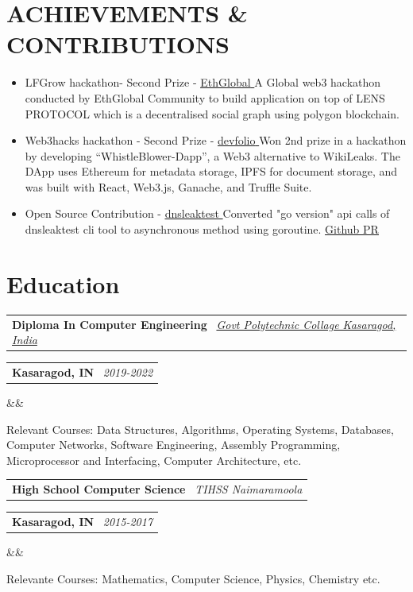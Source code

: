 \documentclass[11pt,a4paper,sans]{moderncv}
\makeatletter
\newcommand*{\customcventry}[7][0.13em]{
  \begin{tabular}{@{}l}
    {\bfseries #4} \
    {\itshape #3}
  \end{tabular}
  \hfill
  \begin{tabular}{l@{}}
    {\bfseries #5} \
    {\itshape #2}
  \end{tabular}
  \ifx&#7&
  \else{\
    \begin{minipage}{\maincolumnwidth}
      \small#7
  \end{minipage}}\fi
  \par\addvspace{#1}
}
\makeatother
\begin{document}
\section{ACHIEVEMENTS \& CONTRIBUTIONS}
{
  \begin{itemize}[label=\textbullet]
    \item LFGrow hackathon- Second Prize -
      \underline{
        \color{blue}\href{https://ethglobal.com/showcase/zilly-b3y8b}{EthGlobal}
      }
      \newline A Global web3 hackathon conducted by EthGlobal Community to
      build application on top of LENS PROTOCOL which is a
      decentralised social graph using polygon blockchain.

    \item Web3hacks hackathon - Second Prize -
      \underline{
        \color{blue}
        \href{https://devfolio.co/projects/whistleblower-c8a5}{devfolio}
      }
      \newline Won 2nd prize in a hackathon by developing
      “WhistleBlower-Dapp”, a Web3
      alternative to WikiLeaks. The DApp uses Ethereum for metadata
      storage, IPFS for
      document storage, and was built with React, Web3.js, Ganache,
      and Truffle Suite.

    \item Open Source Contribution -
      \underline{
        \color{blue}\href{https://github.com/macvk/dnsleaktest}{dnsleaktest}
      }
      \newline Converted "go version"
      api calls of dnsleaktest cli tool to
      asynchronous method using goroutine.
      \underline{
        \color{blue}\href{https://github.com/macvk/dnsleaktest/pull/12}{Github
        PR}
      }

  \end{itemize}
}

\section{Education}
\customcventry{2019-2022}
{\color{blue}\href{https://gpckasaragod.ac.in/} {Govt Polytechnic
Collage Kasaragod, India}}
{Diploma In Computer Engineering}{Kasaragod, IN}{}{}
{Relevant Courses:
  Data Structures, Algorithms, Operating Systems, Databases, Computer Networks,
  Software Engineering, Assembly Programming, Microprocessor and Interfacing,
Computer Architecture, etc.}
\newline

\customcventry{2015-2017}{{TIHSS Naimaramoola}}{High School Computer
Science}{Kasaragod, IN}{}{}{Relevante Courses: Mathematics, Computer
Science, Physics, Chemistry  etc.}
\end{document}

